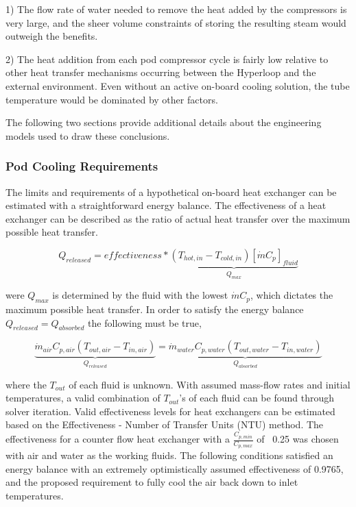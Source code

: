 \documentclass[heading.tex]{subfiles}
\begin{document}
1) The flow rate of water needed to remove the heat added by the compressors is very large, and the sheer volume constraints of storing
the resulting steam would outweigh the benefits.

2) The heat addition from each pod compressor cycle is fairly low relative to other heat transfer mechanisms occurring between the Hyperloop
and the external environment. Even without an active on-board cooling solution, the tube temperature would be dominated by other factors.

The following two sections provide additional details about the engineering models used to draw these conclusions.

\subsubsection{Pod Cooling Requirements}

The limits and requirements of a hypothetical on-board heat exchanger can be estimated with a straightforward energy balance. The
effectiveness of a heat exchanger can be described as the ratio of actual heat transfer over the maximum possible heat transfer.

\begin{equation}
{Q}_{released}  = effectiveness *\underbrace{\left(T_{hot,in} - T_{cold,in}\right) [ \dot{m} C_{p} ]_{fluid}}_\text{${Q}_{max}$}
\end{equation}


were ${Q}_{max}$ is determined by the fluid with the lowest $\dot{m} C_{p}$, which dictates the maximum possible heat transfer.
In order to satisfy the energy balance $Q_{released}=Q_{absorbed}$ the following must be true,

\begin{equation}
\underbrace{\dot{m}_{air} C_{p, air} (T_{out, air} - T_{in, air})}_{{Q}_{released}}  = \underbrace{\dot{m}_{water} C_{p,water} (T_{out, water} - T_{in, water})}_{{Q}_{absorbed}}
\end{equation}

where the $T_{out}$  of each fluid is unknown. With assumed mass-flow rates and initial temperatures, a valid combination of $T_{out}$'s of
each fluid can be found through solver iteration. Valid effectiveness levels for heat exchangers can be estimated based on the
Effectiveness - Number of Transfer Units (NTU) method. 
The effectiveness for a counter flow heat exchanger with a $\frac{C_{p,min}}{C_{p,max}}$ of ~0.25 was chosen with air and water as the working fluids. 
The following conditions satisfied an energy balance with an extremely optimistically assumed effectiveness of 0.9765,
and the proposed requirement to fully cool the air back down to inlet temperatures.
\end{document}
